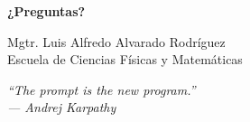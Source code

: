 \documentclass[aspectratio=169]{beamer}
\begin{document}
\begin{frame}
    \centering
    \Huge \textbf{¿Preguntas?}
    
    \vspace{0.5cm}
    \normalsize
    Mgtr. Luis Alfredo Alvarado Rodríguez\\
    \small Escuela de Ciencias Físicas y Matemáticas
    
    \vspace{0.5cm}
    \footnotesize
    \textit{``The prompt is the new program.''\\--- Andrej Karpathy}
\end{frame}
\end{document}
